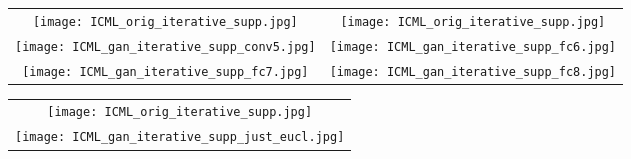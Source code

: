 \documentclass{article}
\newcommand{\conv}{\textsc{conv}}
\newcommand{\fc}{\textsc{fc}}
\begin{document}
\begin{figure*}
\begin{center}
\setlength{\tabcolsep}{0.1cm}
\begin{tabular}{cc}
\texttt{[image: ICML\_orig\_iterative\_supp.jpg]} &
\texttt{[image: ICML\_orig\_iterative\_supp.jpg]} \\
\texttt{[image: ICML\_gan\_iterative\_supp\_conv5.jpg]} &
\texttt{[image: ICML\_gan\_iterative\_supp\_fc6.jpg]} \\
\texttt{[image: ICML\_gan\_iterative\_supp\_fc7.jpg]} &
\texttt{[image: ICML\_gan\_iterative\_supp\_fc8.jpg]}
\end{tabular}
\end{center}
\caption{Iterative re-encoding and reconstructions for different layers of AlexNet.
Each row of each block corresponds to an iteration number: 1, 2, 4, 6, 8, 12, 16, 20.
\textbf{Topmost:} input images,
\textbf{Top left:} \conv5,
\textbf{Top right:} \fc6,
\textbf{Bottom left:} \fc7,
\textbf{Bottom right:} \fc8.}
\label{fig:iterative}
\end{figure*}

\begin{figure*}
\begin{center}
\setlength{\tabcolsep}{0.1cm}
\begin{tabular}{c}
\texttt{[image: ICML\_orig\_iterative\_supp.jpg]} \\
\texttt{[image: ICML\_gan\_iterative\_supp\_just\_eucl.jpg]}
\end{tabular}
\end{center}
\caption{Iterative re-encoding and reconstructions with network trained to reconstruct from AlexNet \fc6 layer with squared Euclidean loss in the image space.
On top the input images are shown.
Then each row corresponds to an iteration number: 1, 2, 4, 6, 8, 12, 16, 20.}
\label{fig:iterative_eucl}
\end{figure*}
\end{document}

